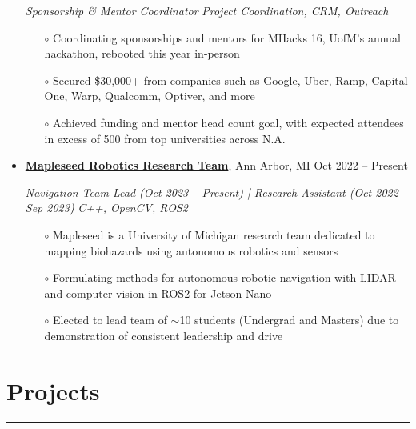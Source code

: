 \documentclass[10pt]{article}
\newcommand{\cussection}[1]{\vspace{-0.3in}\section*{#1}\vspace{-0.15in} \hrule\vspace{0.05in} }
\begin{document}
\begin{itemize}
      \textit{Sponsorship \& Mentor Coordinator}  \hfill \textit{Project Coordination, CRM, Outreach}

        \begin{itemize}[topsep=0pt]   
        \item[$\circ$] Coordinating sponsorships and mentors for MHacks 16, UofM's annual hackathon, rebooted this year in-person
            \item[$\circ$] Secured \$30,000+ from companies such as Google, Uber, Ramp, Capital One, Warp, Qualcomm, Optiver, and more
            \item[$\circ$] Achieved funding and mentor head count goal, with expected attendees in excess of 500 from top universities across N.A.
    
        \end{itemize}	      	
    \vspace{2pt}
    \item       \href{https://mdp.engin.umich.edu/research_teams/mapleseed-23/} {\textbf{Mapleseed Robotics Research Team}}, Ann Arbor, MI \hfill Oct 2022 -- Present
    
    \textit{Navigation Team Lead (Oct 2023 -- Present) | Research Assistant (Oct 2022 -- Sep 2023)}  \hfill \textit{C++, OpenCV, ROS2}
    \begin{itemize}[topsep=0pt]  
        \item[$\circ$] Mapleseed is a University of Michigan research team dedicated to mapping biohazards using autonomous robotics and sensors
        \item[$\circ$] Formulating methods for autonomous robotic navigation with LIDAR and computer vision in ROS2 for Jetson Nano
        \item[$\circ$] Elected to lead team of $\sim$10
 students (Undergrad and Masters) due to demonstration of consistent leadership and drive
    \end{itemize}
    
	      	                 
\end{itemize}    


\cussection{Projects}
\vspace{5pt}
\end{document}
